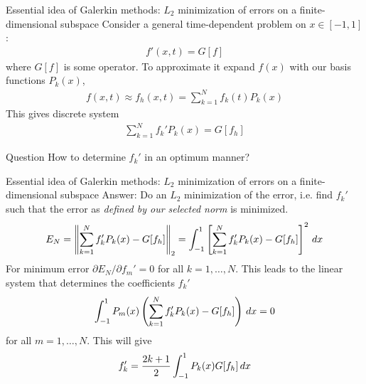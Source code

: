 \documentclass[pdf]{beamer}
\newcommand{\mypause}{}
\theoremstyle{definition}
\begin{document}

\begin{frame}{Essential idea of Galerkin methods: $L_2$ minimization
    of errors on a finite-dimensional subspace}
  \small
  Consider a general time-dependent problem on $x\in [-1,1]$:
  \begin{align*}
    f'(x,t) = G[f]
  \end{align*}
  where $G[f]$ is some operator. To approximate it expand $f(x)$ with
  our basis functions $P_k(x)$,
  \begin{align*}
    f(x,t) \approx f_h(x,t)  = \sum_{k=1}^N f_k(t) P_k(x)
  \end{align*}
  This gives discrete system
  \begin{align*}
    \sum_{k=1}^N f_k' P_k(x) = G[f_h]
  \end{align*}
  \mypause
  \begin{block}{Question}
    How to determine $f_k'$ in an optimum manner?
  \end{block}
  
\end{frame}

\begin{frame}{Essential idea of Galerkin methods: $L_2$ minimization
    of errors on a finite-dimensional subspace}
  \small
  Answer: Do an $L_2$ minimization of the error, i.e. find $f_k'$ such
  that the error as \emph{defined by our selected norm} is minimized.
  \begin{align*}
    E_N = \left \| \sum_{k=1}^N f_k' P_k(x) - G[f_h] \right \|_2
    = 
    \int_{-1}^1 \left[
      \sum_{k=1}^N f_k' P_k(x) - G[f_h]\right]^2\thinspace dx
  \end{align*}
  For minimum error $\partial E_N/\partial f_m' = 0$ for all
  $k=1,\ldots,N$. This leads to the linear system that determines the
  coefficients $f_k'$
  \begin{align*}
    \int_{-1}^1 P_m(x) \left(
      \sum_{k=1}^N f_k' P_k(x) - G[f_h]
    \right)\thinspace dx = 0
  \end{align*}
  for all $m=1,\ldots,N$. This will give
  \begin{align*}
    f_k'  = \frac{2k+1}{2}\int_{-1}^1 P_k(x) G[f_h] \thinspace dx
  \end{align*}  
\end{frame}
\end{document}
